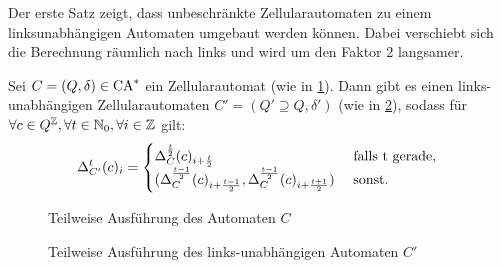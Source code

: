 Der erste Satz zeigt, dass unbeschränkte Zellularautomaten zu einem linksunabhängigen Automaten
umgebaut werden können. Dabei verschiebt sich die Berechnung räumlich nach links und wird um den Faktor 2 langsamer.
\begin{satz}
    \label{zellautoZuLinksunabhaengig}
    Sei $C = (Q, \delta) \in \textrm{CA}^*$ ein Zellularautomat (wie in \cref{fig:NormalZuRechtsUnabh}).
    Dann gibt es einen links-unabhängigen Zellularautomaten $C' = (Q' \supseteq Q, \delta')$ (wie in \cref{fig:NormalZuRechtsUnabh2}),
    sodass
    für $\forall c \in Q^{\mathbb{Z}}, \forall t \in \mathbb{N}_0, \forall i \in \mathbb{Z}$ gilt:
    \[
            \Delta_{C'}^{t}(c)_i =
            \begin{cases}
                \Delta_C^{\frac{t}{2}}(c)_{i+\frac{t}{2}} & \text{ falls } $t$ \text{ gerade, } \\
                (\Delta_C^{\frac{t - 1}{2}}(c)_{i+\frac{t - 1}{2}}, \Delta_C^{\frac{t-1}{2}}(c)_{i+\frac{t+1}{2}})  & \text{ sonst.}
            \end{cases}
    \]
        
    \begin{figure}[h!]
        \centering
        
        \caption{Teilweise Ausführung des Automaten $C$}
        \label{fig:NormalZuRechtsUnabh}
    \end{figure}
   \begin{figure}[h!]
        \centering
        
        \caption{Teilweise Ausführung des links-unabhängigen Automaten $C'$}
        \label{fig:NormalZuRechtsUnabh2}
    \end{figure}

\end{satz}
